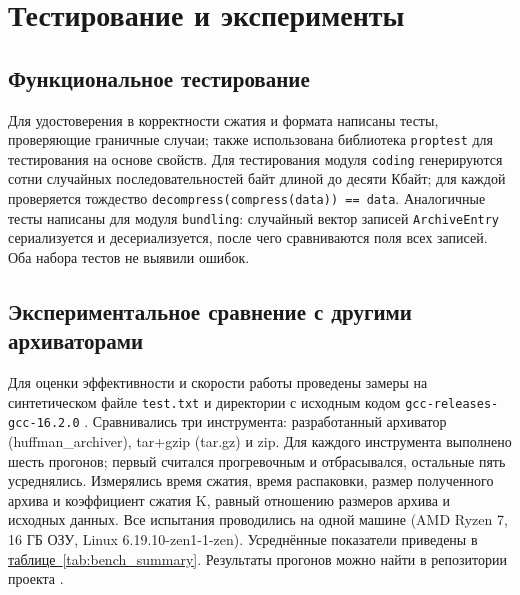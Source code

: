 \documentclass[a4paper]{article}
\begin{document}
\section{Тестирование и эксперименты}

\subsection{Функциональное тестирование}

Для удостоверения в корректности сжатия и формата написаны тесты, проверяющие граничные случаи; также использована библиотека \texttt{proptest} для тестирования на основе свойств. Для тестирования модуля \texttt{coding} генерируются сотни случайных последовательностей байт длиной до десяти Кбайт; для каждой проверяется тождество \texttt{decompress(compress(data)) == data}. Аналогичные тесты написаны для модуля \texttt{bundling}: случайный вектор записей \texttt{ArchiveEntry} сериализуется и десериализуется, после чего сравниваются поля всех записей. Оба набора тестов не выявили ошибок.

\subsection{Экспериментальное сравнение с другими архиваторами}

Для оценки эффективности и скорости работы проведены замеры на синтетическом файле \texttt{test.txt} и директории с исходным кодом \texttt{gcc-releases-gcc-16.2.0} \cite{gcc_source}. Сравнивались три инструмента: разработанный архиватор (huffman\_archiver), tar+gzip (tar.gz) и zip. Для каждого инструмента выполнено шесть прогонов; первый считался прогревочным и отбрасывался, остальные пять усреднялись. Измерялись время сжатия, время распаковки, размер полученного архива и коэффициент сжатия K, равный отношению размеров архива и исходных данных. Все испытания проводились на одной машине (AMD Ryzen 7, 16 ГБ ОЗУ, Linux 6.19.10-zen1-1-zen). Усреднённые показатели приведены в \hyperref[tab:bench_summary]{таблице~\ref*{tab:bench_summary}}. Результаты прогонов можно найти в репозитории проекта \cite{raw_data}.
\end{document}
